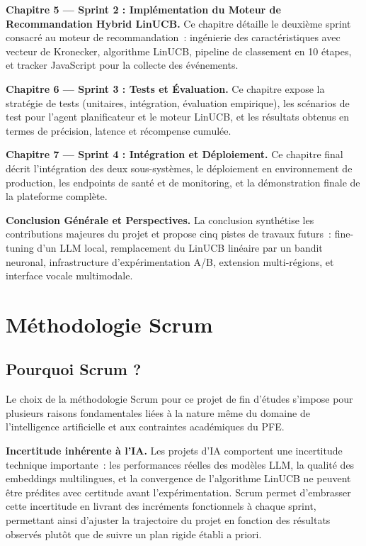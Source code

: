 \textbf{Chapitre 5 — Sprint 2 : Implémentation du Moteur de Recommandation Hybrid LinUCB.} Ce 
chapitre détaille le deuxième sprint consacré au moteur de recommandation~: ingénierie des 
caractéristiques avec vecteur de Kronecker, algorithme LinUCB, pipeline de classement en 10 
étapes, et tracker JavaScript pour la collecte des événements.

\textbf{Chapitre 6 — Sprint 3 : Tests et Évaluation.} Ce chapitre expose la stratégie de tests 
(unitaires, intégration, évaluation empirique), les scénarios de test pour l'agent planificateur 
et le moteur LinUCB, et les résultats obtenus en termes de précision, latence et récompense 
cumulée.

\textbf{Chapitre 7 — Sprint 4 : Intégration et Déploiement.} Ce chapitre final décrit 
l'intégration des deux sous-systèmes, le déploiement en environnement de production, les endpoints 
de santé et de monitoring, et la démonstration finale de la plateforme complète.

\textbf{Conclusion Générale et Perspectives.} La conclusion synthétise les contributions majeures 
du projet et propose cinq pistes de travaux futurs~: fine-tuning d'un LLM local, remplacement du 
LinUCB linéaire par un bandit neuronal, infrastructure d'expérimentation A/B, extension 
multi-régions, et interface vocale multimodale.

\section{Méthodologie Scrum}

\subsection{Pourquoi Scrum ?}

Le choix de la méthodologie Scrum pour ce projet de fin d'études s'impose pour plusieurs raisons 
fondamentales liées à la nature même du domaine de l'intelligence artificielle et aux contraintes 
académiques du PFE.

\textbf{Incertitude inhérente à l'IA.} Les projets d'IA comportent une incertitude technique 
importante~: les performances réelles des modèles LLM, la qualité des embeddings multilingues, 
et la convergence de l'algorithme LinUCB ne peuvent être prédites avec certitude avant 
l'expérimentation. Scrum permet d'embrasser cette incertitude en livrant des incréments 
fonctionnels à chaque sprint, permettant ainsi d'ajuster la trajectoire du projet en fonction 
des résultats observés plutôt que de suivre un plan rigide établi a priori.

